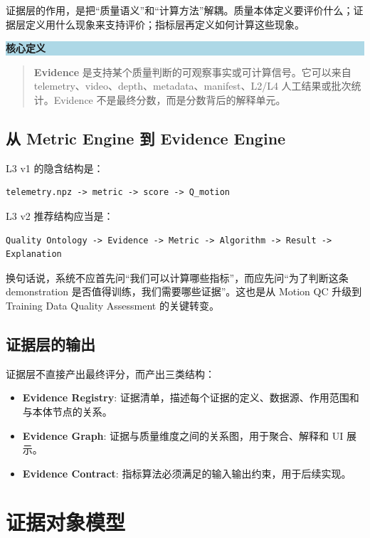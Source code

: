 \documentclass[UTF8,zihao=-4,oneside,openany]{ctexrep}
\newcommand{\Term}[1]{\textbf{#1}}
\newenvironment{notebox}[1]{\vspace{0.5em}\noindent\colorbox{LightBlue}{\parbox{0.96\linewidth}{\textbf{#1}}}\par\vspace{-0.2em}\begin{quote}\small}{\end{quote}\vspace{0.3em}}
\begin{document}
证据层的作用，是把“质量语义”和“计算方法”解耦。质量本体定义要评价什么；证据层定义用什么现象来支持评价；指标层再定义如何计算这些现象。

\begin{notebox}{核心定义}
\Term{Evidence} 是支持某个质量判断的可观察事实或可计算信号。它可以来自 telemetry、video、depth、metadata、manifest、L2/L4 人工结果或批次统计。Evidence 不是最终分数，而是分数背后的解释单元。
\end{notebox}

\subsection{从 Metric Engine 到 Evidence Engine}

L3 v1 的隐含结构是：

\begin{verbatim}
telemetry.npz -> metric -> score -> Q_motion
\end{verbatim}

L3 v2 推荐结构应当是：

\begin{verbatim}
Quality Ontology -> Evidence -> Metric -> Algorithm -> Result -> Explanation
\end{verbatim}

换句话说，系统不应首先问“我们可以计算哪些指标”，而应先问“为了判断这条 demonstration 是否值得训练，我们需要哪些证据”。这也是从 Motion QC 升级到 Training Data Quality Assessment 的关键转变。

\subsection{证据层的输出}

证据层不直接产出最终评分，而产出三类结构：

\begin{itemize}
  \item \Term{Evidence Registry}: 证据清单，描述每个证据的定义、数据源、作用范围和与本体节点的关系。
  \item \Term{Evidence Graph}: 证据与质量维度之间的关系图，用于聚合、解释和 UI 展示。
  \item \Term{Evidence Contract}: 指标算法必须满足的输入输出约束，用于后续实现。
\end{itemize}

\section{证据对象模型}
\end{document}
